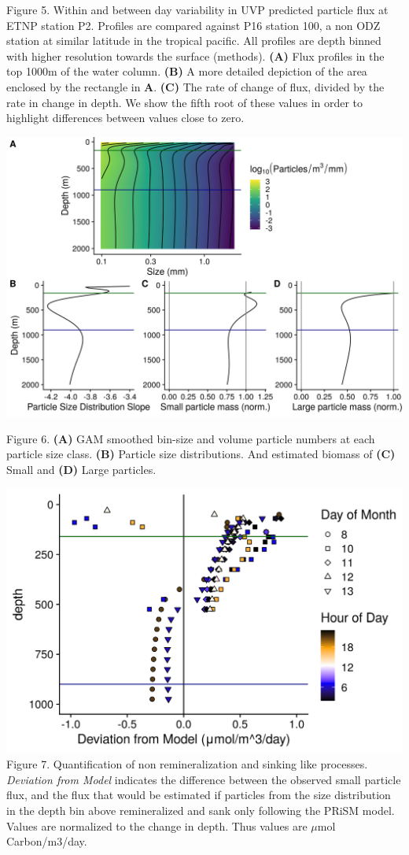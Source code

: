 \documentclass[]{article}
\begin{document}
Figure 5. Within and between day variability in UVP predicted particle
flux at ETNP station P2. Profiles are compared against P16 station 100,
a non ODZ station at similar latitude in the tropical pacific. All
profiles are depth binned with higher resolution towards the surface
(methods). \textbf{(A)} Flux profiles in the top 1000m of the water
column. \textbf{(B)} A more detailed depiction of the area enclosed by
the rectangle in \textbf{A}. \textbf{(C)} The rate of change of flux,
divided by the rate in change in depth. We show the fifth root of these
values in order to highlight differences between values close to zero.

\includegraphics{../figures/WBModelValidation.png}

Figure 6. \textbf{(A)} GAM smoothed bin-size and volume particle numbers
at each particle size class. \textbf{(B)} Particle size distributions.
And estimated biomass of \textbf{(C)} Small and \textbf{(D)} Large
particles.

\includegraphics{../figures/FluxSizeShift.png} Figure 7. Quantification
of non remineralization and sinking like processes. \emph{Deviation from
Model} indicates the difference between the observed small particle
flux, and the flux that would be estimated if particles from the size
distribution in the depth bin above remineralized and sank only
following the PRiSM model. Values are normalized to the change in depth.
Thus values are \(\mu\)mol Carbon/m3/day.
\end{document}
